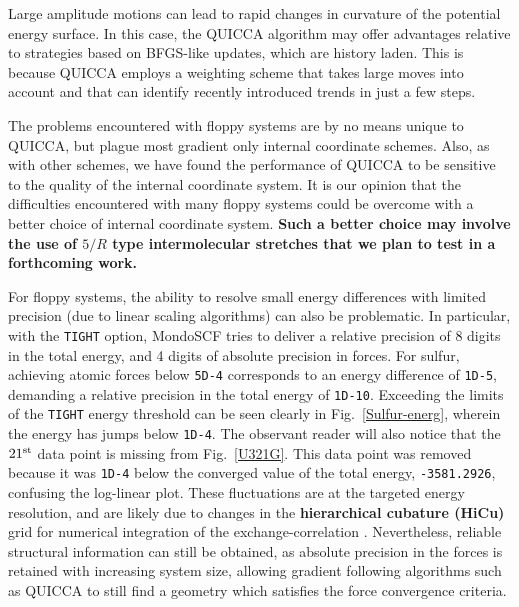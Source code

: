 \twolinestyle{\documentclass[prb,preprint]{revtex4}}
\begin{document}
Large amplitude motions can lead to rapid changes in curvature of the 
potential energy surface.  In this case, the QUICCA algorithm may offer
advantages relative to strategies based on BFGS-like updates, which are 
history laden.   This is because QUICCA employs a weighting scheme that 
takes large moves into account and that can identify recently introduced
trends in just a few steps.

The problems encountered with floppy systems are by no means unique to QUICCA,
but plague most gradient only internal coordinate schemes.  Also, as with other
schemes, we have found the performance of QUICCA to be sensitive to the quality 
of the internal coordinate system.  It is our opinion that the difficulties 
encountered with many floppy systems could be overcome with a better choice
of internal coordinate system.  
{\bf
Such a better choice may involve the use of $5/R$ type intermolecular 
stretches \cite{JBaker00,TBucko05} that we plan to test in a 
forthcoming work.
}


For floppy systems, the ability to resolve small energy differences with 
limited precision (due to linear scaling algorithms) can also be problematic.
In particular, with the {\tt TIGHT} option, {\sc MondoSCF} tries to deliver a 
relative precision of 8 digits in the total energy, and 4 digits of absolute 
precision in forces.  For sulfur, achieving atomic forces below {\tt 5D-4} 
corresponds to an energy difference of {\tt 1D-5}, demanding a relative 
precision in the total energy of {\tt 1D-10}.  Exceeding the limits of the
{\tt TIGHT} energy threshold can be seen clearly in Fig.~\ref{Sulfur-energ},
wherein the energy has jumps below {\tt 1D-4}.  The observant reader will also
notice that the $21^{\rm st}$ data point is missing from Fig.~\ref{U321G}.  This 
data point was removed because it was {\tt 1D-4} below the converged value of the 
total energy, {\tt   -3581.2926}, confusing the log-linear plot. These 
fluctuations are at the targeted energy resolution, and are likely due to 
changes in the 
{\bf
hierarchical cubature (HiCu)
}
grid for numerical integration of the 
exchange-correlation \cite{CTymczak05a}.  
Nevertheless, reliable structural information can still be obtained, as absolute 
precision in the forces is retained with increasing system size, allowing gradient following
algorithms such as QUICCA to still find a geometry which satisfies the force convergence
criteria. 
\end{document}
